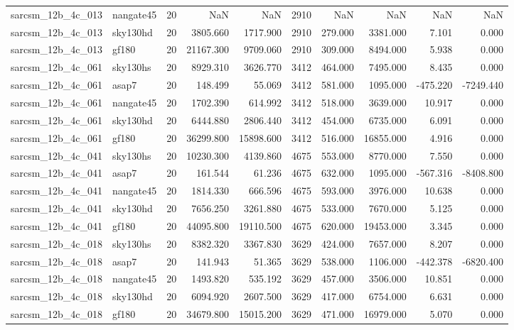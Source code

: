 \begin{longtable}{llrrrrrrrr}
sarcsm\_12b\_4c\_013 & nangate45 & 20 & NaN & NaN & 2910 & NaN & NaN & NaN & NaN \\
sarcsm\_12b\_4c\_013 & sky130hd & 20 & 3805.660 & 1717.900 & 2910 & 279.000 & 3381.000 & 7.101 & 0.000 \\
sarcsm\_12b\_4c\_013 & gf180 & 20 & 21167.300 & 9709.060 & 2910 & 309.000 & 8494.000 & 5.938 & 0.000 \\
sarcsm\_12b\_4c\_061 & sky130hs & 20 & 8929.310 & 3626.770 & 3412 & 464.000 & 7495.000 & 8.435 & 0.000 \\
sarcsm\_12b\_4c\_061 & asap7 & 20 & 148.499 & 55.069 & 3412 & 581.000 & 1095.000 & -475.220 & -7249.440 \\
sarcsm\_12b\_4c\_061 & nangate45 & 20 & 1702.390 & 614.992 & 3412 & 518.000 & 3639.000 & 10.917 & 0.000 \\
sarcsm\_12b\_4c\_061 & sky130hd & 20 & 6444.880 & 2806.440 & 3412 & 454.000 & 6735.000 & 6.091 & 0.000 \\
sarcsm\_12b\_4c\_061 & gf180 & 20 & 36299.800 & 15898.600 & 3412 & 516.000 & 16855.000 & 4.916 & 0.000 \\
sarcsm\_12b\_4c\_041 & sky130hs & 20 & 10230.300 & 4139.860 & 4675 & 553.000 & 8770.000 & 7.550 & 0.000 \\
sarcsm\_12b\_4c\_041 & asap7 & 20 & 161.544 & 61.236 & 4675 & 632.000 & 1095.000 & -567.316 & -8408.800 \\
sarcsm\_12b\_4c\_041 & nangate45 & 20 & 1814.330 & 666.596 & 4675 & 593.000 & 3976.000 & 10.638 & 0.000 \\
sarcsm\_12b\_4c\_041 & sky130hd & 20 & 7656.250 & 3261.880 & 4675 & 533.000 & 7670.000 & 5.125 & 0.000 \\
sarcsm\_12b\_4c\_041 & gf180 & 20 & 44095.800 & 19110.500 & 4675 & 620.000 & 19453.000 & 3.345 & 0.000 \\
sarcsm\_12b\_4c\_018 & sky130hs & 20 & 8382.320 & 3367.830 & 3629 & 424.000 & 7657.000 & 8.207 & 0.000 \\
sarcsm\_12b\_4c\_018 & asap7 & 20 & 141.943 & 51.365 & 3629 & 538.000 & 1106.000 & -442.378 & -6820.400 \\
sarcsm\_12b\_4c\_018 & nangate45 & 20 & 1493.820 & 535.192 & 3629 & 457.000 & 3506.000 & 10.851 & 0.000 \\
sarcsm\_12b\_4c\_018 & sky130hd & 20 & 6094.920 & 2607.500 & 3629 & 417.000 & 6754.000 & 6.631 & 0.000 \\
sarcsm\_12b\_4c\_018 & gf180 & 20 & 34679.800 & 15015.200 & 3629 & 471.000 & 16979.000 & 5.070 & 0.000 \\

\end{longtable}
